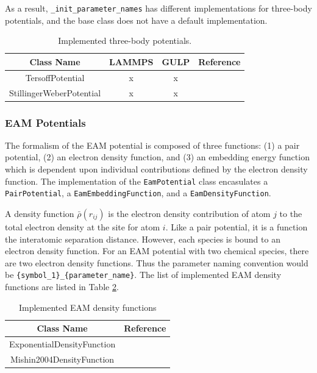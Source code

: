 As a result, \verb|_init_parameter_names| has different implementations for three-body potentials, and the base class does not have a default implementation.

\begin{table}[ht]
	\centering
	\caption{Implemented three-body potentials.}
	\label{tbl:pypospack_threebody_potentials}
	\begin{tabular}{cccc}
		\hline
		{Class Name} & LAMMPS & GULP & Reference \\
		\hline
		TersoffPotential & x & x & \cite{tersoff1988_tersoff} \\
		StillingerWeberPotential & x & x &\cite{stillinger1985_sw} \\
		\hline
	\end{tabular}
\end{table}

\subsubsection{EAM Potentials}

The formalism of the EAM potential is composed of three functions: (1) a pair potential, (2) an electron density function, and (3) an embedding energy function which is dependent upon individual contributions defined by the electron density function.
The implementation of the \verb|EamPotential| class encasulates a \verb|PairPotential|, a \verb|EamEmbeddingFunction|, and a \verb|EamDensityFunction|.

  A density function $\bar{\rho}(r_{ij})$ is the electron density contribution of atom $j$ to the total electron density at the site for atom $i$.  Like a pair potential, it is a function the interatomic separation distance.  However, each species is bound to an electron density function.  For an EAM potential with two chemical species, there are two electron density functions.  Thus the parameter naming convention would be \verb|{symbol_1}_{parameter_name}|.
	The list of implemented EAM density functions are listed in Table \ref{tbl:pypospack_eam_density_function}.

\begin{table}[ht]
	\centering
	\caption{Implemented EAM density functions}
	\label{tbl:pypospack_eam_density_function}
	\begin{tabular}{cc}
		\hline
		{Class Name} & {Reference} \\
		\hline
		ExponentialDensityFunction & \\
		Mishin2004DensityFunction & \cite{mishin2004_eam_NiAl} \\
		\hline
	\end{tabular}
\end{table}

